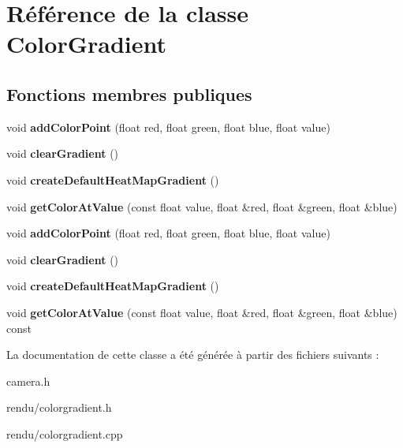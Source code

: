 \hypertarget{class_color_gradient}{}\section{Référence de la classe Color\+Gradient}
\label{class_color_gradient}
\subsection*{Fonctions membres publiques}
\begin{DoxyCompactItemize}
\item 
\hypertarget{class_color_gradient_a611f25f238e0781f27d2821971f4ac27}{}void {\bfseries add\+Color\+Point} (float red, float green, float blue, float value)\label{class_color_gradient_a611f25f238e0781f27d2821971f4ac27}

\item 
\hypertarget{class_color_gradient_aeaa1447003e70159ab0bcd4197f80aa4}{}void {\bfseries clear\+Gradient} ()\label{class_color_gradient_aeaa1447003e70159ab0bcd4197f80aa4}

\item 
\hypertarget{class_color_gradient_ae8e90e868e0904445061b9522d3764c4}{}void {\bfseries create\+Default\+Heat\+Map\+Gradient} ()\label{class_color_gradient_ae8e90e868e0904445061b9522d3764c4}

\item 
\hypertarget{class_color_gradient_a649c65cfb22510f8dfc82978b409e7e7}{}void {\bfseries get\+Color\+At\+Value} (const float value, float \&red, float \&green, float \&blue)\label{class_color_gradient_a649c65cfb22510f8dfc82978b409e7e7}

\item 
\hypertarget{class_color_gradient_a611f25f238e0781f27d2821971f4ac27}{}void {\bfseries add\+Color\+Point} (float red, float green, float blue, float value)\label{class_color_gradient_a611f25f238e0781f27d2821971f4ac27}

\item 
\hypertarget{class_color_gradient_aeaa1447003e70159ab0bcd4197f80aa4}{}void {\bfseries clear\+Gradient} ()\label{class_color_gradient_aeaa1447003e70159ab0bcd4197f80aa4}

\item 
\hypertarget{class_color_gradient_ae8e90e868e0904445061b9522d3764c4}{}void {\bfseries create\+Default\+Heat\+Map\+Gradient} ()\label{class_color_gradient_ae8e90e868e0904445061b9522d3764c4}

\item 
\hypertarget{class_color_gradient_a2dfdd3a89831c4fa6cadd77dbf83cb04}{}void {\bfseries get\+Color\+At\+Value} (const float value, float \&red, float \&green, float \&blue) const \label{class_color_gradient_a2dfdd3a89831c4fa6cadd77dbf83cb04}

\end{DoxyCompactItemize}


La documentation de cette classe a été générée à partir des fichiers suivants \+:\begin{DoxyCompactItemize}
\item 
camera.\+h\item 
rendu/colorgradient.\+h\item 
rendu/colorgradient.\+cpp\end{DoxyCompactItemize}
